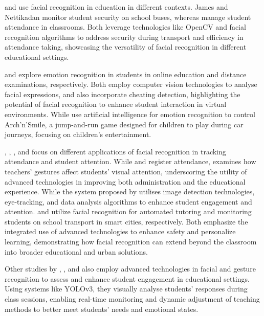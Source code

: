 \documentclass[a4paper,fleqn]{cas-sc}
\begin{document}
			\cite{James2019} and %
			\cite{Hachad2020} use facial recognition in education in different contexts. James and Nettikadan \cite{James2019} monitor student security on school buses, whereas %
			\cite{Hachad2020} manage student attendance in classrooms. Both leverage technologies like OpenCV and facial recognition algorithms to address security during transport and efficiency in attendance taking, showcasing the versatility of facial recognition in different educational settings.
			
			\cite{Enadula2021} and %
			\cite{Ozdamli2022} explore emotion recognition in students in online education and distance examinations, respectively. Both employ computer vision technologies to analyse facial expressions, and %
			\cite{Ozdamli2022} also incorporate cheating detection, highlighting the potential of facial recognition to enhance student interaction in virtual environments. While \cite{Muller2018ArchnSmile} use artificial intelligence for emotion recognition to control Arch'n'Smile, a jump-and-run game designed for children to play during car journeys, focusing on children's entertainment.
			
			\cite{Kulkarni2023},%
			\cite{Narkhede2023}, %
			\cite{Farsani2020}, and
			\cite{Kumar2024Zoom} focus on different applications of facial recognition in tracking attendance and student attention. While %
			\cite{Kulkarni2023} and %
			\cite{Narkhede2023} register attendance, %
			\cite{Farsani2020} examines how teachers' gestures affect students' visual attention, underscoring the utility of advanced technologies in improving both administration and the educational experience.
			While the system proposed by \cite{Kumar2024Zoom} utilises image detection technologies, eye-tracking, and data analysis algorithms to enhance student engagement and attention.
			\cite{Boumiza2017} and %
			\cite{DaCosta2023} utilize facial recognition for automated tutoring and monitoring students on school transport in smart cities, respectively. Both emphasize the integrated use of advanced technologies to enhance safety and personalize learning, demonstrating how facial recognition can extend beyond the classroom into broader educational and urban solutions.
			
			Other studies by %
			\cite{Riquelme2013}, %
			\cite{Nguyen2019}, and %
			\cite{Argel2023Intellitell} also employ advanced technologies in facial and gesture recognition to assess and enhance student engagement in educational settings. Using systems like YOLOv3, they visually analyse students' responses during class sessions, enabling real-time monitoring and dynamic adjustment of teaching methods to better meet students' needs and emotional states.
			
\end{document}
